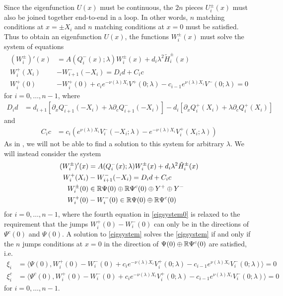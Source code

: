 \documentclass[thesis.tex]{subfiles}
\begin{document}
Since the eigenfunction $U(x)$ must be continuous, the $2n$ pieces $U_i^\pm(x)$ must also be joined together end-to-end in a loop. In other words, $n$ matching conditions at $x = \pm X_i$ and $n$ matching conditions at $x = 0$ must be satisfied. Thus to obtain an eigenfunction $U(x)$, the functions $W_i^\pm(x)$ must solve the system of equations
\begin{equation}\label{eigsystem0}
\begin{aligned}
(W_i^\pm)'(x) &= A(Q_i^-(x); \lambda) W_i^\pm(x) + d_i \lambda^2 \tilde{H}_i^\pm(x) \\
W_i^+(X_i) &- W_{i+1}^-(-X_i) = D_i d + C_i c \\
W_i^+(0) &- W_i^+(0) + c_i e^{-\nu(\lambda)X_i}V^+(0; \lambda) - c_{i-1} e^{\nu(\lambda)X_i} V^-(0; \lambda) = 0
\end{aligned}
\end{equation}
for $i = 0, \dots, n-1$, where
\begin{align}\label{defDid}
D_i d &= d_{i+1}[\partial_x Q_{i+1}^-(-X_i) + \lambda \partial_c Q_{i+1}^-(-X_i)]
- d_i [ \partial_x Q_i^+(X_i) + \lambda \partial_c Q_i^+(X_i) ]
\end{align}
and
\begin{align}\label{defCic}
C_i c &= c_i \left( e^{\nu(\lambda) X_i} V_i^-(-X_i; \lambda) - e^{-\nu(\lambda) X_i} V_i^+(X_i; \lambda) \right)
\end{align}
As in \cite{Sandstede1998}, we will not be able to find a solution to this system for arbitrary $\lambda$. We will instead consider the system
\begin{equation}\label{eigsystem}
\begin{aligned}
(W_i^\pm)'(x) &= A(Q_i^-(x); \lambda) W_i^\pm(x) + d_i \lambda^2 \tilde{H}_i^\pm(x) \\
W_i^+(X_i) &- W_{i+1}^-(-X_i) = D_i d + C_i c \\
W_i^\pm(0) &\in \mathbb{R} \Psi(0) \oplus \mathbb{R} \Psi^c(0) \oplus Y^+ \oplus Y^- \\
W_i^+(0) &- W_i^-(0) \in \mathbb{R} \Psi(0) \oplus \mathbb{R} \Psi^c(0) 
\end{aligned}
\end{equation}
for $i = 0, \dots, n-1$, where the fourth equation in \cref{eigsystem0} is relaxed to the requirement that the jumps $W_i^+(0) - W_i^-(0)$ can only be in the directions of $\Psi^c(0)$ and $\Psi(0)$. A solution to \eqref{eigsystem} solves the \cref{eigsystem} if and only if the $n$ jumps conditions at $x = 0$ in the direction of $\Psi(0) \oplus \mathbb{R} \Psi^c(0)$ are satisfied, i.e.  
\begin{equation}\label{jumpxi1}
\begin{aligned}
\xi_i &= \langle \Psi(0), W_i^+(0) - W_i^-(0) + c_i e^{-\nu(\lambda)X_i}V_i^+(0; \lambda) - c_{i-1} e^{\nu(\lambda)X_i} V_i^-(0; \lambda) \rangle = 0  \\
\xi_i^c &= \langle \Psi^c(0), W_i^+(0) - W_i^-(0) + c_i e^{-\nu(\lambda)X_i}V_i^+(0; \lambda) - c_{i-1} e^{\nu(\lambda)X_i} V_i^-(0; \lambda) \rangle = 0 
\end{aligned}
\end{equation}
for $i = 0, \dots, n-1$. 
\end{document}
